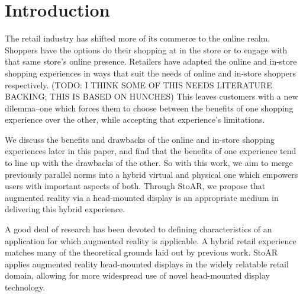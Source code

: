 \section{Introduction}

The retail industry has shifted more of its commerce to the online realm.  Shoppers have the options do their shopping at in the store or to engage with that same store's online presence.  Retailers have adapted the online and in-store shopping experiences in ways that suit the needs of online and in-store shoppers respectively.  (TODO:  I THINK SOME OF THIS NEEDS LITERATURE BACKING; THIS IS BASED ON HUNCHES)  This leaves customers with a new dilemma--one which forces them to choose between the benefits of one shopping experience over the other, while accepting that experience's limitations.

We discuss the benefits and drawbacks of the online and in-store shopping experiences later in this paper, and find that the benefits of one experience tend to line up with the drawbacks of the other.  So with this work, we aim to merge previously parallel norms into a hybrid virtual and physical one which empowers users with important aspects of both.  Through StoAR, we propose that augmented reality via a head-mounted display is an appropriate medium in delivering this hybrid experience.

A good deal of research has been devoted to defining characteristics of an application for which augmented reality is applicable.  A hybrid retail experience matches many of the theoretical grounds laid out by previous work.  StoAR applies augmented reality head-mounted displays in the widely relatable retail domain, allowing for more widespread use of novel head-mounted display technology.
